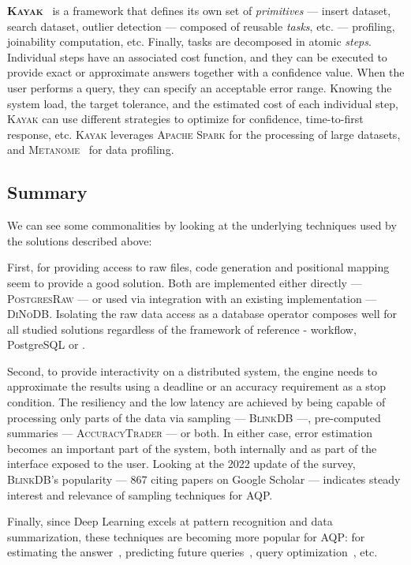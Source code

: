 \medskip

\textbf{\textsc{Kayak}}~\cite{maccioni_crossing_2017} is a framework that defines its own
set of \textit{primitives} --- insert dataset, search dataset, outlier detection --- composed of 
reusable \textit{tasks}, etc. --- profiling, joinability computation, etc. Finally, tasks
are decomposed in atomic \textit{steps}.
Individual steps have an associated cost function, and they can be executed to provide exact
or approximate answers together with a confidence value. When the user performs a query, they can
specify an acceptable error range. Knowing the system load, the target tolerance, and the estimated
cost of each individual step, \textsc{Kayak} can use different strategies to optimize for confidence,
time-to-first response, etc.
\textsc{Kayak} leverages \textsc{Apache Spark} for the processing of
large datasets, and \textsc{Metanome}~\cite{papenbrock2015data} for data profiling.

\subsection{Summary}
We can see some commonalities by looking at the underlying techniques used by the 
solutions described above:

First, for providing access to raw files, code generation and positional 
mapping seem to provide a good solution. Both are implemented either directly --- 
\textsc{PostgresRaw} --- or used via integration with an existing implementation --- \textsc{DiNoDB}.
Isolating the raw data access as a database operator composes well for all 
studied solutions regardless of the framework of reference - workflow, 
PostgreSQL or \scidb.

Second, to provide interactivity on a distributed system, the engine 
needs to approximate the results using a deadline or an accuracy requirement as 
a stop condition. The resiliency and the low latency are achieved by 
being capable of processing only parts of the data via sampling --- \textsc{BlinkDB} ---, 
pre-computed summaries --- \textsc{AccuracyTrader} --- or both. In either case, error 
estimation becomes an important part of the system, both internally and as 
part of the interface exposed to the user.
Looking at the 2022 update of the survey, \textsc{BlinkDB}'s popularity --- 867 citing papers
on Google Scholar --- indicates steady interest and relevance of sampling techniques for \gls{AQP}.

Finally, since Deep Learning excels at pattern recognition and data summarization,
these techniques are becoming more popular for \gls{AQP}: for estimating the 
answer~\cite{regev_approximating_2021,thirumuruganathan_approximate_2020}, predicting
future queries~\cite{shahrivari_workload_2022,meduri_evaluation_2021}, query
optimization~\cite{bi_learningbased_2022}, etc.

